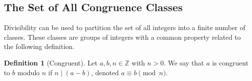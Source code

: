 \documentclass[10pt, titlepage]{amsart}
\newcommand\Z{{\mathbb Z}}
\newtheorem{lemma}{Lemma}[subsection]
\newtheorem{prop}{Proposition}[subsection]
\theoremstyle{definition}
\newtheorem{definition}{Definition}[subsection]
\begin{document}
	\subsection{The Set of All Congruence Classes}
	
	Divisibility can be used to partition the set of all integers into a finite number of classes. 
	These classes are groups of integers with a common property related to the following definition.
	
%	
%	
	
	\begin{definition}[Congruent]\label{definition:congruent}
		Let $a,b,n \in \Z$ with $n > 0$. We say that $a$ is congruent to $b$ modulo $n$ if $n \mid (a - b)$, denoted $a \equiv b \pmod n$. \cite{pommersheim}
	\end{definition}
	
%	
%	
	
\end{document}
